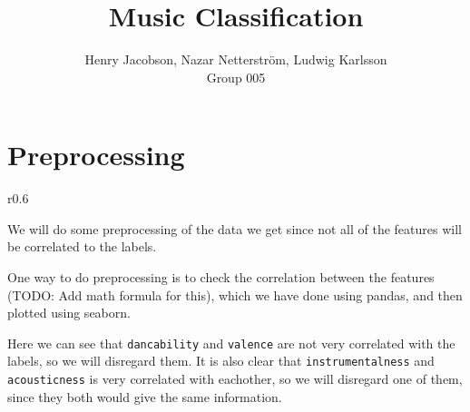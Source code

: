 \documentclass{setup}
\title{Music Classification\\}
\author{Henry Jacobson, Nazar Netterström, Ludwig Karlsson\\Group 005}
\begin{document}
\maketitle
\section{Preprocessing}
\begin{wrapfigure}{r}{0.6\textwidth}
    
\end{wrapfigure}
We will do some preprocessing of the data we get since not all of the features will be correlated to the labels.

One way to do preprocessing is to check the correlation between the features (TODO: Add math formula for this), which we
have done using pandas, and then plotted using seaborn. 

Here we can see that \texttt{dancability} and \texttt{valence} are not very correlated with the labels, so we will disregard them. 
It is also clear that \texttt{instrumentalness} and \texttt{acousticness} is very correlated with eachother, so we will disregard one of
them, since they both would give the same information.
\end{document}

